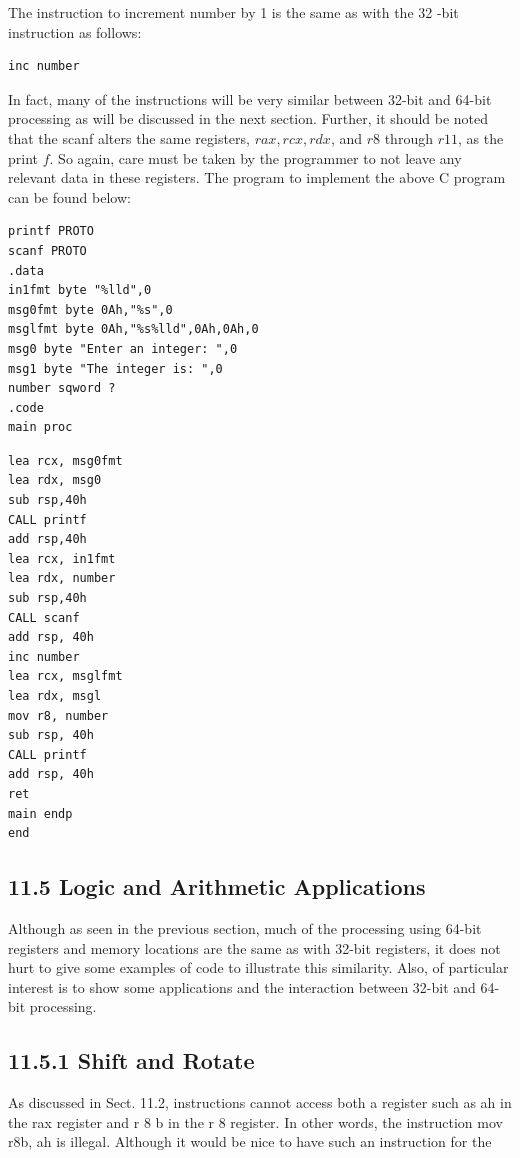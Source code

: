 \documentclass[10pt]{book}
\begin{document}
\begin{center}
\begin{center}
\begin{center}
\begin{center}
The instruction to increment number by 1 is the same as with the 32 -bit instruction as follows:

\begin{verbatim}
inc number
\end{verbatim}

In fact, many of the instructions will be very similar between 32-bit and 64-bit processing as will be discussed in the next section. Further, it should be noted that the scanf alters the same registers, $r a x, r c x, r d x$, and $r 8$ through $r 11$, as the print $f$. So again, care must be taken by the programmer to not leave any relevant data in these registers. The program to implement the above C program can be found below:

\begin{verbatim}
printf PROTO
scanf PROTO
.data
in1fmt byte "%lld",0
msg0fmt byte 0Ah,"%s",0
msglfmt byte 0Ah,"%s%lld",0Ah,0Ah,0
msg0 byte "Enter an integer: ",0
msg1 byte "The integer is: ",0
number sqword ?
.code
main proc
\end{verbatim}

\begin{verbatim}
lea rcx, msg0fmt
lea rdx, msg0
sub rsp,40h
CALL printf
add rsp,40h
lea rcx, in1fmt
lea rdx, number
sub rsp,40h
CALL scanf
add rsp, 40h
inc number
lea rcx, msglfmt
lea rdx, msgl
mov r8, number
sub rsp, 40h
CALL printf
add rsp, 40h
ret
main endp
end
\end{verbatim}

\subsection*{11.5 Logic and Arithmetic Applications}
Although as seen in the previous section, much of the processing using 64-bit registers and memory locations are the same as with 32-bit registers, it does not hurt to give some examples of code to illustrate this similarity. Also, of particular interest is to show some applications and the interaction between 32-bit and 64-bit processing.

\subsection*{11.5.1 Shift and Rotate}
As discussed in Sect. 11.2, instructions cannot access both a register such as ah in the rax register and r 8 b in the r 8 register. In other words, the instruction mov r8b, ah is illegal. Although it would be nice to have such an instruction for the\\


\end{center}
\end{center}
\end{center}
\end{center}
\end{document}
